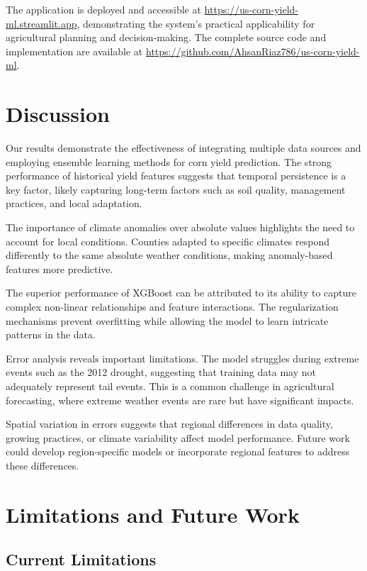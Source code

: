 \documentclass[conference]{IEEEtran}
\begin{document}
The application is deployed and accessible at \url{https://us-corn-yield-ml.streamlit.app}, demonstrating the system's practical applicability for agricultural planning and decision-making. The complete source code and implementation are available at \url{https://github.com/AhsanRiaz786/us-corn-yield-ml}.

\section{Discussion}

Our results demonstrate the effectiveness of integrating multiple data sources and employing ensemble learning methods for corn yield prediction. The strong performance of historical yield features suggests that temporal persistence is a key factor, likely capturing long-term factors such as soil quality, management practices, and local adaptation.

The importance of climate anomalies over absolute values highlights the need to account for local conditions. Counties adapted to specific climates respond differently to the same absolute weather conditions, making anomaly-based features more predictive.

The superior performance of XGBoost can be attributed to its ability to capture complex non-linear relationships and feature interactions. The regularization mechanisms prevent overfitting while allowing the model to learn intricate patterns in the data.

Error analysis reveals important limitations. The model struggles during extreme events such as the 2012 drought, suggesting that training data may not adequately represent tail events. This is a common challenge in agricultural forecasting, where extreme weather events are rare but have significant impacts.

Spatial variation in errors suggests that regional differences in data quality, growing practices, or climate variability affect model performance. Future work could develop region-specific models or incorporate regional features to address these differences.

\section{Limitations and Future Work}

\subsection{Current Limitations}
\end{document}
